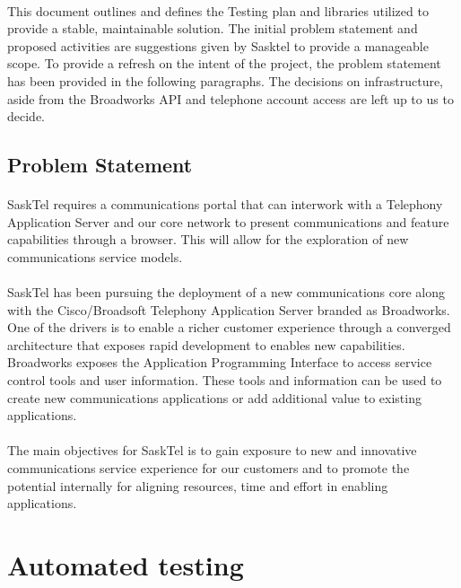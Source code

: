 \documentclass[12pt]{article}
\begin{document}
\paragraph{}
	This document outlines and defines the Testing plan and libraries utilized to provide a stable, maintainable solution. The initial problem statement and proposed activities are suggestions given by Sasktel to provide a manageable scope. To provide a refresh on the intent of the project, the problem statement has been provided in the following paragraphs. The decisions on infrastructure, aside from the Broadworks API and telephone account access are left up to us to decide. 
\subsection{Problem Statement}
\paragraph{} 
	SaskTel requires a communications portal that can interwork with a Telephony Application Server and our core network to present communications and feature capabilities through a browser.  This will allow for the exploration of new communications service models. 
\paragraph{} 
	SaskTel has been pursuing the deployment of a new communications core along with the Cisco/Broadsoft Telephony Application Server branded as Broadworks.  One of the drivers is to enable a richer customer experience through a converged architecture that exposes rapid development to enables new capabilities.  Broadworks exposes the Application Programming Interface to access service control tools and user information.  These tools and information can be used to create new communications applications or add additional value to existing applications.  
\paragraph{} 
	The main objectives for SaskTel is to gain exposure to new and innovative communications service experience for our customers and to promote the potential internally for aligning resources, time and effort in enabling applications.

\section{Automated testing}
\end{document}
